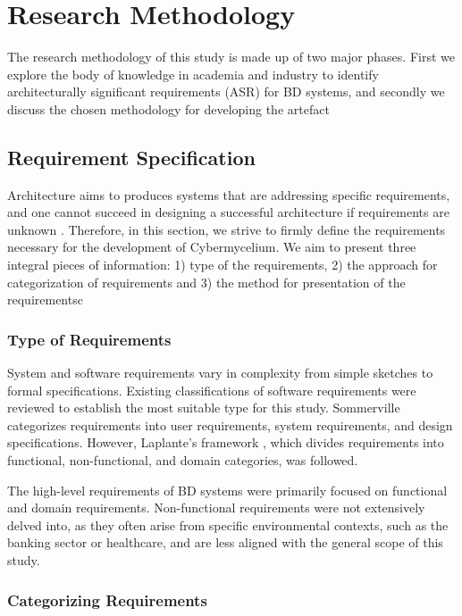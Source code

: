 \documentclass[review]{elsarticle}
\begin{document}
\section{Research Methodology} \label{RM-section}

The research methodology of this study is made up of two major phases. First we explore the body of knowledge in academia and industry to identify architecturally significant requirements (ASR) for BD systems, and secondly we discuss the chosen methodology for developing the artefact


\subsection{Requirement Specification} \label{requirement-spec-methodology}

Architecture aims to produces systems that are addressing specific requirements, and one cannot succeed in designing a successful architecture if requirements are unknown \cite{SoftwareArchitectureKazman}. Therefore, in this section, we strive to firmly define the requirements necessary for the development of Cybermycelium. We aim to present three integral pieces of information: 1) type of the requirements, 2) the approach for categorization of requirements and 3) the method for presentation of the requirementsc


\subsubsection{Type of Requirements}

System and software requirements vary in complexity from simple sketches to formal specifications. Existing classifications of software requirements were reviewed to establish the most suitable type for this study. Sommerville \cite{sommerville2011software} categorizes requirements into user requirements, system requirements, and design specifications. However, Laplante's framework \cite{laplante2017requirements}, which divides requirements into functional, non-functional, and domain categories, was followed.

The high-level requirements of BD systems were primarily focused on functional and domain requirements. Non-functional requirements were not extensively delved into, as they often arise from specific environmental contexts, such as the banking sector or healthcare, and are less aligned with the general scope of this study.

\subsubsection{Categorizing Requirements}
\end{document}
